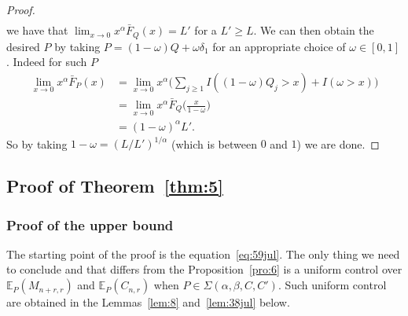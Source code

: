 \documentclass{article}
\newcommand{\1}{\boldsymbol{1}}
\newcommand{\EE}{\mathbb{E}}
\theoremstyle{plain}
\begin{document}
\begin{proof}
\begin{align*}
  \end{align*}
  we have that $\lim_{x\to 0}x^{\alpha}\bar{F}_Q(x) = L'$ for a $L' \geq L$. We can then obtain the desired $P$ by taking $P = (1 - \omega)Q + \omega \delta_1$ for an appropriate choice of $\omega \in [0,1]$. Indeed for such $P$
  \begin{align*}
    \lim_{x \to 0}x^{\alpha}\bar{F}_P(x)
    &= \lim_{x \to 0}x^{\alpha}\Bigg( \sum_{j\geq 1}I((1-\omega)Q_j > x) + I(\omega > x) \Bigg)\\
    &= \lim_{x\to 0}x^{\alpha} \bar{F}_Q\Big(\frac{x}{1-\omega}\Big)\\
    &= (1-\omega)^{\alpha}L'.
  \end{align*}
  So by taking $1 - \omega = (L/L')^{1/\alpha}$ (which is between $0$ and $1$) we are done.
\end{proof}

\subsection{Proof of Theorem~\ref{thm:5}}
\label{sec:proof-thm:5}


\subsubsection{Proof of the upper bound}
\label{sec:proof-upper-bound-1}

The starting point of the proof is the equation~\eqref{eq:59jul}. The only thing we need to conclude and that differs from the Proposition~\ref{pro:6} is a uniform control over $\EE_P(M_{n+r,r})$ and $\EE_P(C_{n,r})$ when $P \in \Sigma(\alpha,\beta,C,C')$. Such uniform control are obtained in the Lemmas~\ref{lem:8} and~\ref{lem:38jul} below.
\end{document}
